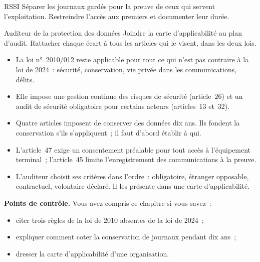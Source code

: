 \begin{boxmetier}{RSSI}
Séparer les journaux gardés pour la preuve de ceux qui servent
l'exploitation. Restreindre l'accès aux premiers et documenter leur durée.
\end{boxmetier}

\begin{boxmetier}{Auditeur de la protection des données}
Joindre la carte d'applicabilité au plan d'audit. Rattacher chaque écart à
tous les articles qui le visent, dans les deux lois.
\end{boxmetier}

\begin{boxresume}
\begin{itemize}
    \item La loi n°~2010/012 reste applicable pour tout ce qui n'est pas
          contraire à la loi de 2024~: sécurité, conservation, vie privée
          dans les communications, délits.
    \item Elle impose une gestion continue des risques de sécurité
          (article~26) et un audit de sécurité obligatoire pour certains
          acteurs (articles~13 et~32).
    \item Quatre articles imposent de conserver des données dix ans. Ils
          fondent la conservation s'ils s'appliquent~; il faut d'abord
          établir à qui.
    \item L'article~47 exige un consentement préalable pour tout accès à
          l'équipement terminal~; l'article~45 limite l'enregistrement des
          communications à la preuve.
    \item L'auditeur choisit ses critères dans l'ordre~: obligatoire,
          étranger opposable, contractuel, volontaire déclaré. Il les
          présente dans une carte d'applicabilité.
\end{itemize}
\end{boxresume}

\begin{boxinfo}
\textbf{Points de contrôle.} Vous avez compris ce chapitre si vous savez~:
\begin{itemize}
    \item citer trois règles de la loi de 2010 absentes de la loi de 2024~;
    \item expliquer comment coter la conservation de journaux pendant dix
          ans~;
    \item dresser la carte d'applicabilité d'une organisation.
\end{itemize}
\end{boxinfo}

